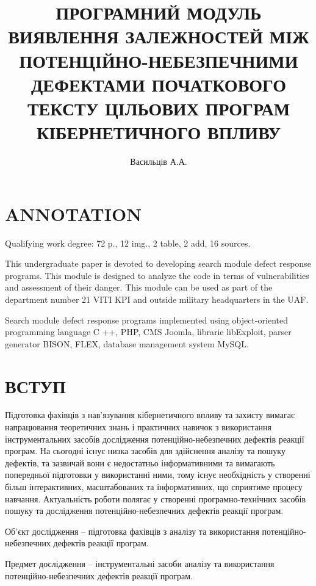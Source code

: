 \documentclass[oneside,final,14pt]{extreport}
\title{ПРОГРАМНИЙ МОДУЛЬ ВИЯВЛЕННЯ ЗАЛЕЖНОСТЕЙ МІЖ ПОТЕНЦІЙНО-НЕБЕЗПЕЧНИМИ ДЕФЕКТАМИ ПОЧАТКОВОГО ТЕКСТУ ЦІЛЬОВИХ ПРОГРАМ КІБЕРНЕТИЧНОГО ВПЛИВУ}
\author{Васильців А.А.}
\begin{document}
\maketitle %
\tableofcontents %
\newpage %
\section{ANNOTATION}
\label{0annotation:annotation}
Qualifying work degree: 72 p., 12 img., 2 table, 2 add, 16 sources.

This undergraduate paper is devoted to developing search module defect response programs. This module is designed to analyze the code in terms of vulnerabilities and assessment of their danger. This module can be used as part of the department number 21 VITI KPI and outside military headquarters in the UAF.

Search module defect response programs implemented using object-oriented programming language C ++, PHP, CMS Joomla, librarie libExploit, parser generator BISON, FLEX, database management system MySQL.
\pagebreak

\section{ВСТУП}
\label{1entrance::doc}\label{1entrance:id1}
Підготовка фахівців з нав’язування кібернетичного впливу та захисту вимагає напрацювання теоретичних знань і практичних навичок з використання інструментальних засобів дослідження потенційно-небезпечних дефектів реакції програм. На сьогодні існує низка засобів для здійснення аналізу та пошуку дефектів, та зазвичай вони є недостатньо інформативними та вимагають попередньої підготовки у використанні ними, тому існує необхідність у створенні більш інтерактивних, масштабованих та інформативних, що сприятиме процесу навчання. Актуальність роботи полягає у створенні програмно-технічних засобів пошуку та дослідження потенційно-небезпечних дефектів реакції програм.

Об’єкт дослідження – підготовка фахівців з аналізу та використання потенційно-небезпечних дефектів реакції програм.

Предмет дослідження – інструментальні засоби  аналізу та використання потенційно-небезпечних дефектів реакції програм.
\end{document}
